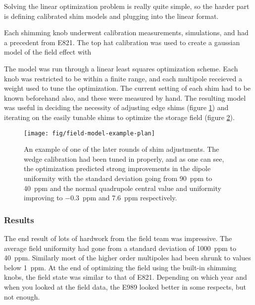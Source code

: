 Solving the linear optimization problem is really quite simple, so the harder part is defining calibrated shim models and plugging into the linear format.

Each shimming knob underwent calibration measurements, simulations, and had a precedent from E821.  The top hat calibration was used to create a gaussian model of the field effect with


The model was run through a linear least squares optimization scheme.  Each knob was restricted to be within a finite range, and each multipole receieved a weight used to tune the optimization.  The current setting of each shim had to be known beforehand also, and these were measured by hand.  The resulting model was useful in deciding the necessity of adjusting edge shims (figure \ref{fig:field-model-edge-adjustments}) and iterating on the easily tunable shims to optimize the storage field (figure \ref{fig:field-model-example-plan}).

\begin{figure}
\label{fig:field-model-edge-adjustments}
\caption{}
\end{figure}

\begin{figure}
\label{fig:field-model-example-plan}
\texttt{[image: fig/field-model-example-plan]}
\caption{An example of one of the later rounds of shim adjustments.  The wedge calibration had been tuned in properly, and as one can see, the optimization predicted strong improvements in the dipole uniformity with the standard deviation going from \SI{90}{ppm} to \SI{40}{ppm} and the normal quadrupole central value and uniformity improving to \SI{-0.3}{ppm} and \SI{7.6}{ppm} respectively. }
\end{figure}

\subsubsection{Results}

The end result of lots of hardwork from the field team was impressive.  The average field uniformity had gone from a standard deviation of \SI{1000}{ppm}  to \SI{40}{ppm}.  Similarly most of the higher order multipoles had been shrunk to values below \SI{1}{ppm}.  At the end of optimizing the field using the built-in shimming knobs, the field state was similar to that of E821.  Depending on which year and when you looked at the field data, the E989 looked better in some respects, but not enough.

